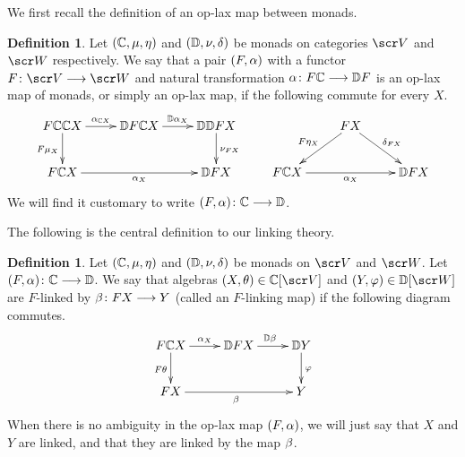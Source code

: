 \documentclass{amsart}
\theoremstyle{definition}
\newtheorem{defn}[thm]{Definition}
\begin{document}
We first recall the definition of an op-lax map between monads.

\begin{defn}\label{def:oplax}
    Let $(\mathbb{C},\mu,\eta)$ and $(\mathbb{D},\nu,\delta)$ be monads on categories $\sV$ and $\sW$ respectively. We say that a pair $(F,\alpha)$ with a functor $F \colon \sV \rtarr \sW$ and natural transformation $\alpha \colon F \mathbb{C} \longrightarrow \mathbb{D} F$ is an op-lax map of monads, or simply an op-lax map, if the following commute for every $X$.
    \[
    \xymatrix{
        F \bC \bC X \ar[r]^{\al_{\bC X}} \ar[d]_{F\mu_X} & \bD F \bC X \ar[r]^{\bD \al_X} & \bD \bD F X \ar[d]^{\nu_{FX}} \\
        F \bC X \ar[rr]_{\al_X} && \bD F X
    } \qquad 
    \xymatrix{
        & FX \ar[dl]_{F\et_X} \ar[dr]^{\de_{FX}} &\\
        F \bC X \ar[rr]_{\al_X} && \bD F X
    }
    \]
    We will find it customary to write $(F,\alpha) \colon \mathbb{C} \longrightarrow \mathbb{D}$.
\end{defn}
The following is the central definition to our linking theory. 

\begin{defn}\label{def:link}
Let $(\mathbb{C},\mu,\eta)$ and $(\mathbb{D},\nu,\delta)$ be monads on $\sV$ and $\sW$. Let $(F,\alpha) \colon \mathbb{C} \longrightarrow \mathbb{D}$.
We say that algebras $(X,\theta) \in \bC[\sV]$ and $(Y,\phz) \in \bD[\sW]$ are $F$-linked by $\beta \colon FX \longrightarrow Y$ (called an $F$-linking map) if the following diagram commutes.
\[
\xymatrix{
    F \bC X \ar[d]_{F\theta} \ar[r]^{\al_X} & \bD F X \ar[r]^{\bD \be} & \bD Y \ar[d]^{\phz}\\
    FX \ar[rr]_{\be} && Y
}
\]
\noindent When there is no ambiguity in the op-lax map $(F,\alpha)$, we will just say that $X$ and $Y$ are linked, and that they are linked by the
map $\beta$. 
\end{defn}
\end{document}

